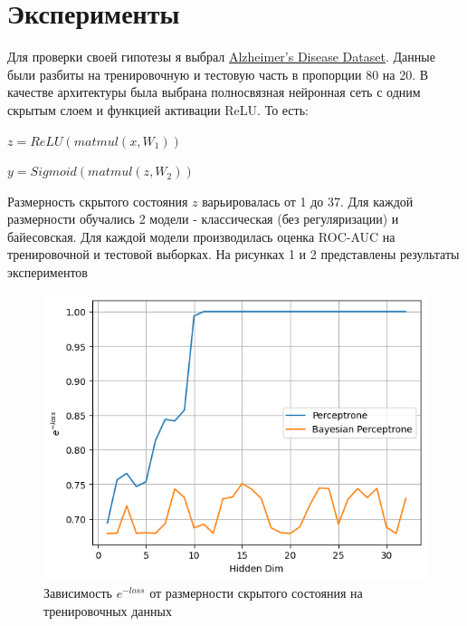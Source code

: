 \documentclass{article}
\begin{document}
\section{Эксперименты}

Для проверки своей гипотезы я выбрал \href{https://www.kaggle.com/datasets/rabieelkharoua/alzheimers-disease-dataset}{Alzheimer's Disease Dataset}. Данные были разбиты на тренировочную и тестовую часть в пропорции 80 на 20. В качестве архитектуры была выбрана полносвязная нейронная сеть с одним скрытым слоем и функцией активации ReLU. То есть:

$z = ReLU(matmul(x, W_1))$

$y = Sigmoid(matmul(z, W_2))$

Размерность скрытого состояния $z$ варьировалась от 1 до 37. Для каждой размерности обучались 2 модели - классическая (без регуляризации) и байесовская. Для каждой модели производилась оценка ROC-AUC на тренировочной и тестовой выборках. На рисунках 1 и 2 представлены результаты экспериментов

\begin{figure}
    \centering
    \includegraphics[width=1\linewidth]{loss.png}
    \caption{Зависимость $e^{-loss}$ от размерности скрытого состояния на тренировочных данных}
    \label{fig:enter-label}
\end{figure}
\end{document}
